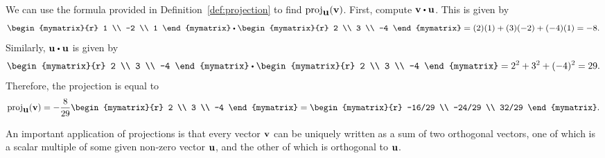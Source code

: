 \begin{solution}
  We can use the formula provided in Definition~\ref{def:projection}
  to find $\proj_{\vect{u}}(\vect{v})$.  First, compute
  $\vect{v} \dotprod \vect{u}$.  This is given by
  \begin{equation*}
    \begin{mymatrix}{r}
      1 \\
      -2 \\
      1
    \end{mymatrix}
    \dotprod
    \begin{mymatrix}{r}
      2 \\
      3 \\
      -4
    \end{mymatrix}
    = (2)(1) + (3)(-2) + (-4)(1)
    = -8.
   \end{equation*}
   Similarly, $\vect{u} \dotprod \vect{u}$ is given by 
   \begin{equation*}
     \begin{mymatrix}{r}
       2 \\
       3 \\
       -4 
     \end{mymatrix}
     \dotprod
     \begin{mymatrix}{r}
       2 \\
       3 \\
       -4
     \end{mymatrix}
     = 2^2 + 3^2 + (-4)^2
     = 29.
  \end{equation*}
  Therefore, the projection is equal to  
  \begin{equation*}
    \proj_{\vect{u}}(\vect{v})
    =-\frac{8}{29} 
        \begin{mymatrix}{r}
          2 \\
          3 \\
          -4
        \end{mymatrix}
    = 
        \begin{mymatrix}{r}
          -16/29 \\
          -24/29 \\
          32/29
        \end{mymatrix}.
  \end{equation*}
\end{solution}

An important application of projections is that every vector
$\mbox{\bf v}$ can be uniquely written as a sum of two orthogonal vectors,
one of which is a scalar multiple of some given non-zero vector
$\mbox{\bf u}$, and the other of which is orthogonal to $\mbox{\bf u}$.

